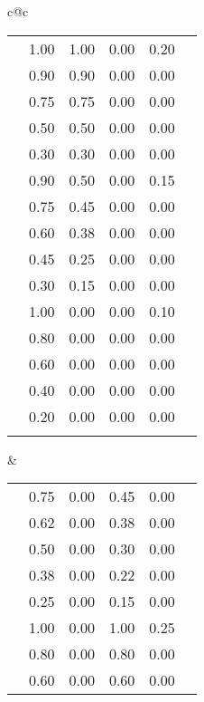 \begin{table}[!ht]
\begin{center}
\begin{scriptsize}
\begin{tabular}{c@{\quad}c}
\begin{tabular}{|c|c|cccc|}
\clspc
\clrow{verydarkblue}            & 1.00 & 1.00 & 0.00 & 0.20 \\
\clrow{darkblue}                & 0.90 & 0.90 & 0.00 & 0.00 \\
\clrow{blue}                    & 0.75 & 0.75 & 0.00 & 0.00 \\
\clrow{lightblue}               & 0.50 & 0.50 & 0.00 & 0.00 \\
\clrow{verylightblue}           & 0.30 & 0.30 & 0.00 & 0.00 \\
\clspc
\clrow{verydarkskyblue}         & 0.90 & 0.50 & 0.00 & 0.15 \\
\clrow{darkskyblue}             & 0.75 & 0.45 & 0.00 & 0.00 \\
\clrow{skyblue}                 & 0.60 & 0.38 & 0.00 & 0.00 \\
\clrow{lightskyblue}            & 0.45 & 0.25 & 0.00 & 0.00 \\
\clrow{verylightskyblue}        & 0.30 & 0.15 & 0.00 & 0.00 \\
\clspc
\clrow{verydarkcyan}            & 1.00 & 0.00 & 0.00 & 0.10 \\
\clrow{darkcyan}                & 0.80 & 0.00 & 0.00 & 0.00 \\
\clrow{cyan}                    & 0.60 & 0.00 & 0.00 & 0.00 \\
\clrow{lightcyan}               & 0.40 & 0.00 & 0.00 & 0.00 \\
\clrow{verylightcyan}           & 0.20 & 0.00 & 0.00 & 0.00 \\
      \clspc
      \hline
    \end{tabular} 
   &
    \begin{tabular}{|c|c|cccc|} \hline
\clspc
\clrow{verydarkseagreen}        & 0.75 & 0.00 & 0.45 & 0.00 \\
\clrow{darkseagreen}            & 0.62 & 0.00 & 0.38 & 0.00 \\
\clrow{seagreen}                & 0.50 & 0.00 & 0.30 & 0.00 \\
\clrow{lightseagreen}           & 0.38 & 0.00 & 0.22 & 0.00 \\
\clrow{verylightseagreen}       & 0.25 & 0.00 & 0.15 & 0.00 \\
\clspc
\clrow{verydarkgreen}           & 1.00 & 0.00 & 1.00 & 0.25 \\
\clrow{darkgreen}               & 0.80 & 0.00 & 0.80 & 0.00 \\
\clrow{green}                   & 0.60 & 0.00 & 0.60 & 0.00 \\

\end{tabular}
\end{tabular}
\end{scriptsize}
\end{center}
\end{table}
